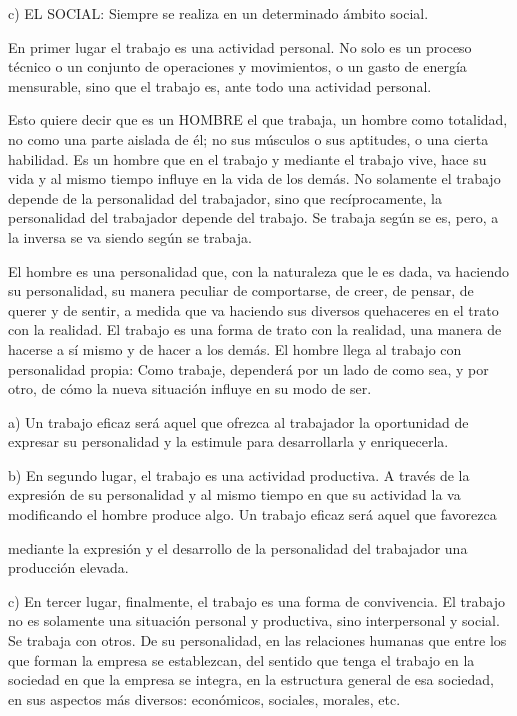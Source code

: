 c) EL SOCIAL: Siempre se realiza en un determinado ámbito social.

En primer lugar el trabajo es una actividad personal. No solo es un proceso técnico o un conjunto de operaciones y movimientos, o un gasto de energía mensurable, sino que el trabajo es, ante todo una actividad personal.

Esto quiere decir que es un HOMBRE el que trabaja, un hombre como totalidad, no como una parte aislada de él; no sus músculos o sus aptitudes, o una cierta habilidad. Es un hombre que en el trabajo y mediante el trabajo vive, hace su vida y al mismo tiempo influye en la vida de los demás. No solamente el trabajo depende de la personalidad del trabajador, sino que recíprocamente, la personalidad del trabajador depende del trabajo. Se trabaja según se es, pero, a la inversa se va siendo según se trabaja.

El hombre es una personalidad que, con la naturaleza que le es dada, va haciendo su personalidad, su manera peculiar de comportarse, de creer, de pensar, de querer y de sentir, a medida que va haciendo sus diversos quehaceres en el trato con la realidad. El trabajo es una forma de trato con la realidad, una manera de hacerse a sí mismo y de hacer a los demás. El hombre llega al trabajo con personalidad propia: Como trabaje, dependerá por un lado de como sea, y por otro, de cómo la nueva situación influye en su modo de ser.

a) Un trabajo eficaz será aquel que ofrezca al trabajador la oportunidad de expresar su personalidad y la estimule para desarrollarla y enriquecerla.

b) En segundo lugar, el trabajo es una actividad productiva. A través de la expresión de su personalidad y al mismo tiempo en que su actividad la va modificando el hombre produce algo. Un trabajo eficaz será aquel que favorezca



mediante la expresión y el desarrollo de la personalidad del trabajador una producción elevada.

c) En tercer lugar, finalmente, el trabajo es una forma de convivencia. El trabajo no es solamente una situación personal y productiva, sino interpersonal y social. Se trabaja con otros. De su personalidad, en las relaciones humanas que entre los que forman la empresa se establezcan, del sentido que tenga el trabajo en la sociedad en que la empresa se integra, en la estructura general de esa sociedad, en sus aspectos más diversos: económicos, sociales, morales, etc.


